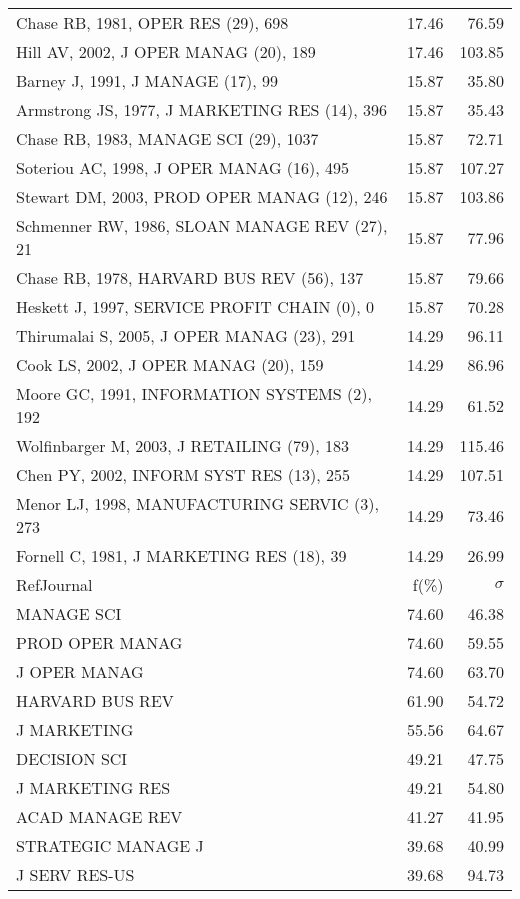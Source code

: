 \documentclass[a4paper,11pt]{report}
\begin{document}
\begin{landscape}
\begin{table}[!ht]
{\begin{tabular}{|l r r|}
Chase RB, 1981, OPER RES (29), 698 & 17.46 & 76.59\\
Hill AV, 2002, J OPER MANAG (20), 189 & 17.46 & 103.85\\
Barney J, 1991, J MANAGE (17), 99 & 15.87 & 35.80\\
Armstrong JS, 1977, J MARKETING RES (14), 396 & 15.87 & 35.43\\
Chase RB, 1983, MANAGE SCI (29), 1037 & 15.87 & 72.71\\
Soteriou AC, 1998, J OPER MANAG (16), 495 & 15.87 & 107.27\\
Stewart DM, 2003, PROD OPER MANAG (12), 246 & 15.87 & 103.86\\
Schmenner RW, 1986, SLOAN MANAGE REV (27), 21 & 15.87 & 77.96\\
Chase RB, 1978, HARVARD BUS REV (56), 137 & 15.87 & 79.66\\
Heskett J, 1997, SERVICE PROFIT CHAIN (0), 0 & 15.87 & 70.28\\
Thirumalai S, 2005, J OPER MANAG (23), 291 & 14.29 & 96.11\\
Cook LS, 2002, J OPER MANAG (20), 159 & 14.29 & 86.96\\
Moore GC, 1991, INFORMATION SYSTEMS (2), 192 & 14.29 & 61.52\\
Wolfinbarger M, 2003, J RETAILING (79), 183 & 14.29 & 115.46\\
Chen PY, 2002, INFORM SYST RES (13), 255 & 14.29 & 107.51\\
Menor LJ, 1998, MANUFACTURING SERVIC (3), 273 & 14.29 & 73.46\\
Fornell C, 1981, J MARKETING RES (18), 39 & 14.29 & 26.99\\
\hline
\hline
RefJournal & f(\%) & $\sigma$\\
\hline
MANAGE SCI & 74.60 & 46.38\\
PROD OPER MANAG & 74.60 & 59.55\\
J OPER MANAG & 74.60 & 63.70\\
HARVARD BUS REV & 61.90 & 54.72\\
J MARKETING & 55.56 & 64.67\\
DECISION SCI & 49.21 & 47.75\\
J MARKETING RES & 49.21 & 54.80\\
ACAD MANAGE REV & 41.27 & 41.95\\
STRATEGIC MANAGE J & 39.68 & 40.99\\
J SERV RES-US & 39.68 & 94.73\\
\hline
\end{tabular}
}
\end{table}

\end{landscape}
\end{document}
